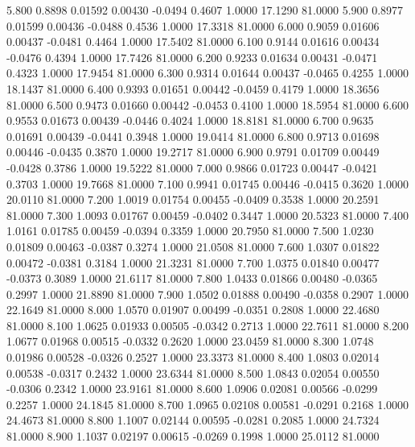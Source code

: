    5.800   0.8898   0.01592   0.00430  -0.0494   0.4607   1.0000  17.1290  81.0000
   5.900   0.8977   0.01599   0.00436  -0.0488   0.4536   1.0000  17.3318  81.0000
   6.000   0.9059   0.01606   0.00437  -0.0481   0.4464   1.0000  17.5402  81.0000
   6.100   0.9144   0.01616   0.00434  -0.0476   0.4394   1.0000  17.7426  81.0000
   6.200   0.9233   0.01634   0.00431  -0.0471   0.4323   1.0000  17.9454  81.0000
   6.300   0.9314   0.01644   0.00437  -0.0465   0.4255   1.0000  18.1437  81.0000
   6.400   0.9393   0.01651   0.00442  -0.0459   0.4179   1.0000  18.3656  81.0000
   6.500   0.9473   0.01660   0.00442  -0.0453   0.4100   1.0000  18.5954  81.0000
   6.600   0.9553   0.01673   0.00439  -0.0446   0.4024   1.0000  18.8181  81.0000
   6.700   0.9635   0.01691   0.00439  -0.0441   0.3948   1.0000  19.0414  81.0000
   6.800   0.9713   0.01698   0.00446  -0.0435   0.3870   1.0000  19.2717  81.0000
   6.900   0.9791   0.01709   0.00449  -0.0428   0.3786   1.0000  19.5222  81.0000
   7.000   0.9866   0.01723   0.00447  -0.0421   0.3703   1.0000  19.7668  81.0000
   7.100   0.9941   0.01745   0.00446  -0.0415   0.3620   1.0000  20.0110  81.0000
   7.200   1.0019   0.01754   0.00455  -0.0409   0.3538   1.0000  20.2591  81.0000
   7.300   1.0093   0.01767   0.00459  -0.0402   0.3447   1.0000  20.5323  81.0000
   7.400   1.0161   0.01785   0.00459  -0.0394   0.3359   1.0000  20.7950  81.0000
   7.500   1.0230   0.01809   0.00463  -0.0387   0.3274   1.0000  21.0508  81.0000
   7.600   1.0307   0.01822   0.00472  -0.0381   0.3184   1.0000  21.3231  81.0000
   7.700   1.0375   0.01840   0.00477  -0.0373   0.3089   1.0000  21.6117  81.0000
   7.800   1.0433   0.01866   0.00480  -0.0365   0.2997   1.0000  21.8890  81.0000
   7.900   1.0502   0.01888   0.00490  -0.0358   0.2907   1.0000  22.1649  81.0000
   8.000   1.0570   0.01907   0.00499  -0.0351   0.2808   1.0000  22.4680  81.0000
   8.100   1.0625   0.01933   0.00505  -0.0342   0.2713   1.0000  22.7611  81.0000
   8.200   1.0677   0.01968   0.00515  -0.0332   0.2620   1.0000  23.0459  81.0000
   8.300   1.0748   0.01986   0.00528  -0.0326   0.2527   1.0000  23.3373  81.0000
   8.400   1.0803   0.02014   0.00538  -0.0317   0.2432   1.0000  23.6344  81.0000
   8.500   1.0843   0.02054   0.00550  -0.0306   0.2342   1.0000  23.9161  81.0000
   8.600   1.0906   0.02081   0.00566  -0.0299   0.2257   1.0000  24.1845  81.0000
   8.700   1.0965   0.02108   0.00581  -0.0291   0.2168   1.0000  24.4673  81.0000
   8.800   1.1007   0.02144   0.00595  -0.0281   0.2085   1.0000  24.7324  81.0000
   8.900   1.1037   0.02197   0.00615  -0.0269   0.1998   1.0000  25.0112  81.0000

